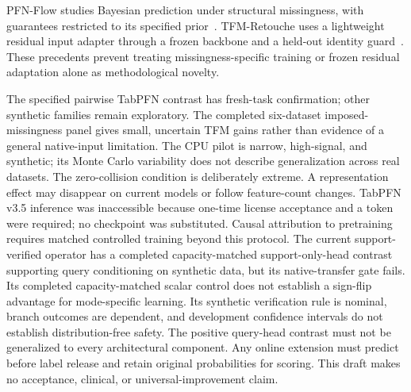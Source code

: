 \documentclass[10pt]{article}
\begin{document}
PFN-Flow studies Bayesian prediction under structural missingness, with guarantees restricted to its specified prior~\cite{liang2026}. TFM-Retouche uses a lightweight residual input adapter through a frozen backbone and a held-out identity guard~\cite{nguyen2026}. These precedents prevent treating missingness-specific training or frozen residual adaptation alone as methodological novelty.

The specified pairwise TabPFN contrast has fresh-task confirmation; other synthetic families remain exploratory. The completed six-dataset imposed-missingness panel gives small, uncertain TFM gains rather than evidence of a general native-input limitation. The CPU pilot is narrow, high-signal, and synthetic; its Monte Carlo variability does not describe generalization across real datasets. The zero-collision condition is deliberately extreme. A representation effect may disappear on current models or follow feature-count changes. TabPFN v3.5 inference was inaccessible because one-time license acceptance and a token were required; no checkpoint was substituted. Causal attribution to pretraining requires matched controlled training beyond this protocol. The current support-verified operator has a completed capacity-matched support-only-head contrast supporting query conditioning on synthetic data, but its native-transfer gate fails. Its completed capacity-matched scalar control does not establish a sign-flip advantage for mode-specific learning. Its synthetic verification rule is nominal, branch outcomes are dependent, and development confidence intervals do not establish distribution-free safety. The positive query-head contrast must not be generalized to every architectural component. Any online extension must predict before label release and retain original probabilities for scoring. This draft makes no acceptance, clinical, or universal-improvement claim.
\end{document}

